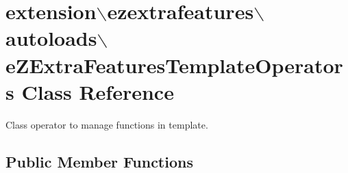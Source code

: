\hypertarget{classextension_1_1ezextrafeatures_1_1autoloads_1_1e_z_extra_features_template_operators}{\section{extension$\backslash$ezextrafeatures$\backslash$autoloads$\backslash$e\-Z\-Extra\-Features\-Template\-Operators Class Reference}
\label{classextension_1_1ezextrafeatures_1_1autoloads_1_1e_z_extra_features_template_operators}
}


Class operator to manage functions in template.  


\subsection*{Public Member Functions}
